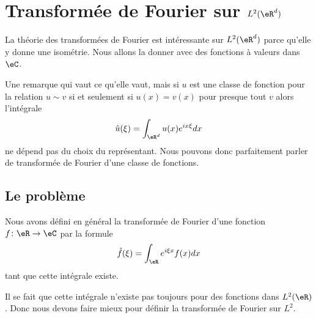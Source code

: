 \section{Transformée de Fourier sur \( L^2(\eR^d)\)}

La théorie des transformées de Fourier est intéressante sur \( L^2(\eR^d)\) parce qu'elle y donne une isométrie. Nous allons la donner avec des fonctions à valeurs dans \( \eC\).

\begin{remark}
    Une remarque qui vaut ce qu'elle vaut, mais si \( u\) est une classe de fonction pour la relation \( u\sim v\) si et seulement si \( u (x)=v(x)\) pour presque tout \( v\) alors l'intégrale
    \begin{equation}
        \hat u(\xi)=\int_{\eR^d}u(x) e^{ix\xi}dx
    \end{equation}
    ne dépend pas du choix du représentant. Nous pouvons donc parfaitement parler de transformée de Fourier d'une classe de fonctions.
\end{remark}

\subsection{Le problème}

Nous avons défini en général la transformée de Fourier d'une fonction \( f\colon \eR\to \eC\) par la formule
\begin{equation}        \label{EQooOPLJooEkqRuC}
    \hat f(\xi)=\int_{\eR} e^{i\xi x } f(x)dx
\end{equation}
tant que cette intégrale existe.

Il se fait que cette intégrale n'existe pas toujours pour des fonctions dans \( L^2(\eR)\). Donc nous devons faire mieux pour définir la transformée de Fourier sur \( L^2\).

